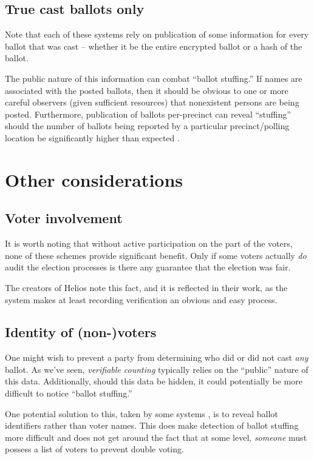 \documentclass[10pt,twocolumn]{article}
\newcommand{\term}[1]{\textit{#1}}
\begin{document}
\subsection{True cast ballots only}

Note that each of these systems rely on publication of some information for every ballot that was
cast -- whether it be the entire encrypted ballot or a hash of the ballot.

The public nature of this information can combat ``ballot stuffing.'' If names are associated with
the posted ballots, then it should be obvious to one or more careful observers (given sufficient
resources) that nonexistent persons are being posted. Furthermore, publication of ballots
per-precinct can reveal ``stuffing'' should the number of ballots being reported by a particular
precinct/polling location be significantly higher than expected \cite{helios}.

\section{Other considerations}

\subsection{Voter involvement}

It is worth noting that without active participation on the part of the voters, none of these
schemes provide significant benefit. Only if some voters actually \emph{do} audit the election
processes is there any guarantee that the election was fair.

The creators of Helios note this fact, and it is reflected in their work, as the system makes at
least recording verification an obvious and easy process.

\subsection{Identity of (non-)voters}

One might wish to prevent a party from determining who did or did not cast \emph{any} ballot.
As we've seen, \term{verifiable counting} typically relies on the ``public'' nature of this data.
Additionally, should this data be hidden, it could potentially be more difficult to notice ``ballot
stuffing.''

One potential solution to this, taken by some systems \cite{preta}, is to reveal ballot identifiers
rather than voter names. This does make detection of ballot stuffing more difficult and does not get
around the fact that at some level, \emph{someone} must possess a list of voters to prevent double
voting.
\end{document}
